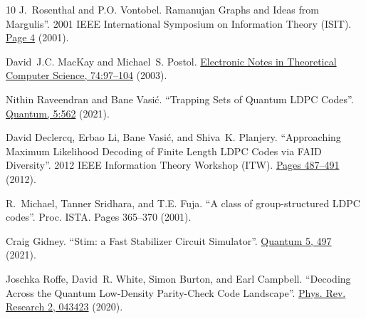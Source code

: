 \documentclass[a4paper,twocolumn,11pt,accepted=2026-05-03]{quantumarticle}
\begin{document}
\begin{thebibliography}{10}
 J.~Rosenthal and P.O. Vontobel.%
  {Ramanujan} Graphs and Ideas from {Margulis}''. 2001 {IEEE} {International} {Symposium} on {Information}
  {Theory} (ISIT). \href{https://doi.org/10.1109/ISIT.2001.935867}{Page 4} (2001).

David~J.C. MacKay and Michael~S. Postol.%
  \href{https://doi.org/10.1016/S1571-0661(04)80768-0}{Electronic Notes in Theoretical Computer Science, 74:97--104} (2003).

Nithin Raveendran and Bane Vasić.
 ``Trapping {Sets} of {Quantum} {LDPC} {Codes}''. \href{https://doi.org/10.22331/q-2021-10-14-562}{ Quantum, 5:562} (2021).

 David Declercq, Erbao Li, Bane Vasić, and Shiva~K. Planjery. ``Approaching Maximum Likelihood Decoding of Finite Length {LDPC}
  Codes via FAID Diversity''. 2012 IEEE Information Theory Workshop (ITW). \href{https://doi.org/10.1109/ITW.2012.6404721}{Pages 487--491} (2012).

 R.~Michael, Tanner Sridhara, and T.E. Fuja.
 ``A class of group-structured LDPC codes''. Proc. ISTA. Pages 365--370 (2001).

 Craig Gidney.
 ``Stim: a Fast Stabilizer Circuit Simulator''.
 \href{https://doi.org/10.22331/q-2021-07-06-497}{Quantum 5, 497} (2021).

 Joschka Roffe, David~R. White, Simon Burton, and Earl Campbell.
 ``Decoding Across the Quantum Low-Density Parity-Check Code Landscape''.
\href{https://link.aps.org/doi/10.1103/PhysRevResearch.2.043423}{Phys. Rev. Research 2, 043423} (2020).

\end{thebibliography}
\end{document}
